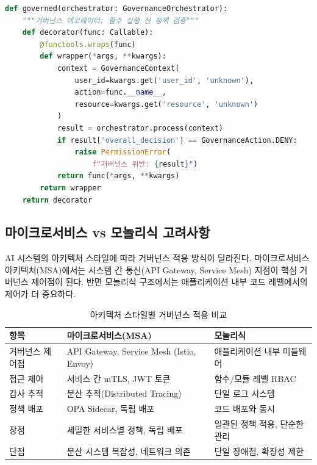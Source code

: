 \begin{lstlisting}[language=Python, caption={거버넌스 계층 아키텍처 구현 (Decorator 패턴 기반)}, label={lst:governance_layer_architecture}]
def governed(orchestrator: GovernanceOrchestrator):
    """거버넌스 데코레이터: 함수 실행 전 정책 검증"""
    def decorator(func: Callable):
        @functools.wraps(func)
        def wrapper(*args, **kwargs):
            context = GovernanceContext(
                user_id=kwargs.get('user_id', 'unknown'),
                action=func.__name__,
                resource=kwargs.get('resource', 'unknown')
            )
            result = orchestrator.process(context)
            if result['overall_decision'] == GovernanceAction.DENY:
                raise PermissionError(
                    f"거버넌스 위반: {result}")
            return func(*args, **kwargs)
        return wrapper
    return decorator
\end{lstlisting}


\subsection{마이크로서비스 vs 모놀리식 고려사항}
\label{sec:13.2.3}

AI 시스템의 아키텍처 스타일에 따라 거버넌스 적용 방식이 달라진다. 마이크로서비스 아키텍처(MSA)에서는 시스템 간 통신(API Gateway, Service Mesh) 지점이 핵심 거버넌스 제어점이 된다. 반면 모놀리식 구조에서는 애플리케이션 내부 코드 레벨에서의 제어가 더 중요하다.

\begin{table}[htbp]
\centering
\caption{아키텍처 스타일별 거버넌스 적용 비교}
\label{tab:msa_monolith_governance}
\begin{tabularx}{\textwidth}{p{3cm}XX}
\toprule
\textbf{항목} & \textbf{마이크로서비스(MSA)} & \textbf{모놀리식} \\
\midrule
거버넌스 제어점 & API Gateway, Service Mesh (Istio, Envoy) & 애플리케이션 내부 미들웨어 \\
\midrule
접근 제어 & 서비스 간 mTLS, JWT 토큰 & 함수/모듈 레벨 RBAC \\
\midrule
감사 추적 & 분산 추적(Distributed Tracing) & 단일 로그 시스템 \\
\midrule
정책 배포 & OPA Sidecar, 독립 배포 & 코드 배포와 동시 \\
\midrule
장점 & 세밀한 서비스별 정책, 독립 배포 & 일관된 정책 적용, 단순한 관리 \\
\midrule
단점 & 분산 시스템 복잡성, 네트워크 의존 & 단일 장애점, 확장성 제한 \\
\bottomrule
\end{tabularx}
\end{table}


